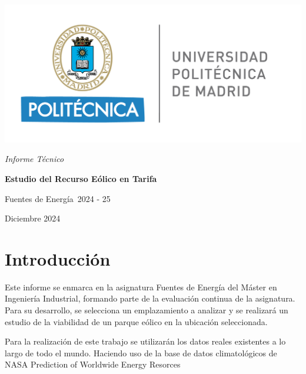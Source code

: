 \documentclass{IEEEtran}
\def\TituloProyecto{Estudio del Recurso Eólico en Tarifa}
\def\Asignatura{Fuentes de Energía}
\def\Curso{2024 - 25}
\def\Fecha{Diciembre 2024}
\begin{document}
\sloppy 
\setlength{\parindent}{30pt}
\setlength{\parskip}{6pt}
\renewcommand\thesection{\arabic{section}}
\renewcommand{\baselinestretch}{1.5}

\fancyhead{}
\fancyfoot{}
\chead[\rightmark]{\leftmark}

\fancyfoot[LE,RO]{\thepage}

\begin{titlepage}
    \centering
    \includegraphics[width=0.5\linewidth]{Imagenes/Logo UPM.png} \par
    \vspace{3 cm}
    {\itshape\huge Informe Técnico \par}
    \vspace{0.5cm}
    {\Huge \textbf{\TituloProyecto} \par}
    \vfill
    {\Large \Asignatura \  \Curso \par}
    \vspace{0.5cm}
    {\Large \Fecha \par}
\end{titlepage}

\tableofcontents

\section{Introducción}

Este informe se enmarca en la asignatura Fuentes de Energía del Máster en Ingeniería Industrial, formando parte de la evaluación continua de la asignatura. Para su desarrollo, se selecciona un emplazamiento a analizar y se realizará un estudio de la viabilidad de un parque eólico en la ubicación seleccionada.

Para la realización de este trabajo se utilizarán los datos reales existentes a lo largo de todo el mundo. Haciendo uso de la base de datos climatológicos de NASA Prediction of Worldwide Energy Resorces \cite{NASA2024}
\end{document}
